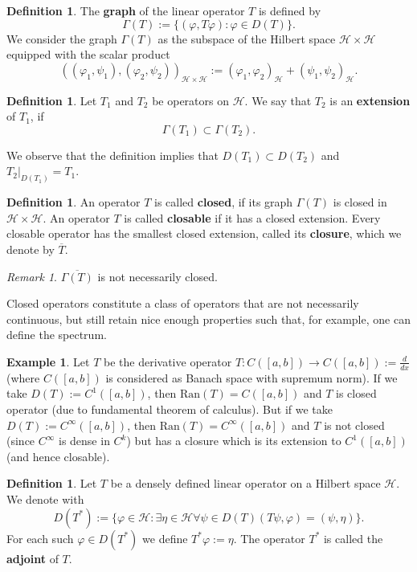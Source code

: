 \documentclass[11pt, a4paper, german]{article}
\theoremstyle{plain}
\theoremstyle{definition}
\newtheorem{definition}[theorem]{Definition}
\newtheorem{example}[theorem]{Example}
\theoremstyle{remark}
\newtheorem{remark}[theorem]{Remark}
\numberwithin{equation}{section}
\numberwithin{theorem}{section}
\DeclareMathOperator{\Exists}{\exists}
\DeclareMathOperator{\Forall}{\forall}
\begin{document}
\begin{definition}
The \textbf{graph} of the linear operator $T$ is defined by $$\Gamma(T) := \{(\varphi, T\varphi): \varphi \in D(T)\}.$$ We consider the graph $\Gamma(T)$ as the subspace of the Hilbert space $\mathcal{H}\times \mathcal{H}$ equipped with the scalar product $$((\varphi_1, \psi_1), (\varphi_2, \psi_2))_{\mathcal{H}\times\mathcal{H}} := (\varphi_1, \varphi_2)_{\mathcal{H}} + (\psi_1, \psi_2)_{\mathcal{H}}.$$
\end{definition}

\begin{definition}
Let $T_1$ and $T_2$ be operators on $\mathcal{H}$. We say that $T_2$ is an \textbf{extension} of $T_1$, if $$\Gamma(T_1) \subset \Gamma(T_2).$$
\end{definition}

We observe that the definition implies that $D(T_1)\subset D(T_2)$ and $T_2|_{D(T_1)} = T_1$.

\begin{definition}
An operator $T$ is called \textbf{closed}, if its graph $\Gamma(T)$ is closed in $\mathcal{H}\times\mathcal{H}$. An operator $T$ is called \textbf{closable} if it has a closed extension. Every closable operator has the smallest closed extension, called its \textbf{closure}, which we denote by $\overline{T}$.
\end{definition}

\begin{remark}
$\overline{\Gamma(T)}$ is not necessarily closed.
\end{remark}

Closed operators constitute a class of operators that are not necessarily continuous, but still retain nice enough properties such that, for example, one can define the spectrum.

\begin{example}
Let $T$ be the derivative operator $T : C([a,b]) \rightarrow C([a,b]):= \frac{d}{dx}$ (where $C([a,b])$ is considered as Banach space with supremum norm). If we take $D(T):=C^1([a,b])$, then $\text{Ran}(T)=C([a,b])$ and $T$ is closed operator (due to fundamental theorem of calculus). But if we take $D(T):=C^\infty([a,b])$, then $\text{Ran}(T)=C^\infty([a,b])$ and $T$ is not closed (since $C^\infty$ is dense in $C^k$) but has a closure which is its extension to $C^1([a,b])$ (and hence closable).
\end{example}

\begin{definition}
Let $T$ be a densely defined linear operator on a Hilbert space $\mathcal{H}$. We denote with $$D(T^*) := \{\varphi \in \mathcal{H} : \Exists \eta \in \mathcal{H} \Forall \psi \in D(T) (T\psi, \varphi) = (\psi, \eta) \}.$$ For each such $\varphi \in D(T^*)$ we define $T^*\varphi := \eta$. The operator $T^*$ is called the \textbf{adjoint} of $T$.
\end{definition}
\end{document}
